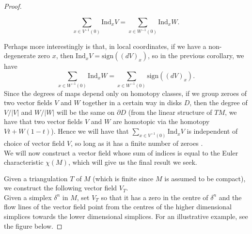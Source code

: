 \begin{proof}
\begin{corollary}
\[
\sum_{x\in V^{-1}(0)}\mathrm{Ind}_xV=\sum_{x\in W^{-1}(0)}\mathrm{Ind}_xW.
\]
\end{corollary}
Perhaps more interestingly is that, in local coordinates, if we have a non-degenerate zero $x$, then $\mathrm{Ind}_xV=\mathrm{sign}((dV)_x)$, so in the previous corollary, we have
\[
\sum_{x\in W^{-1}(0)}\mathrm{Ind}_xW=\sum_{x\in W^{-1}(0)}\mathrm{sign}((dV)_x).
\]
Since the degrees of maps depend only on homotopy classes, if we group zeroes of two vector fields $V$ and $W$ together in a certain way in disks $D$, then the degree of $V/|V|$ and $W/|W|$ will be the same on $\partial D$ (from the linear structure of $TM$, we have that two vector fields $V$ and $W$ are homotopic via the homotopy $Vt+W(1-t)$). Hence we will have that $\sum_{x\in V^{-1}(0)}\mathrm{Ind}_xV$ is independent of choice of vector field $V$, so long as it has a finite number of zeroes \cite{wrightPoincare, BurnsGidea}.\\

We will now construct a vector field whose sum of indices is equal to the Euler characteristic $\chi(M)$, which will give us the final result we seek.

Given a triangulation $T$ of $M$ (which is finite since $M$ is assumed to be compact), we construct the following vector field $V_T$. \\

Given a simplex $\delta^n$ in $M$, set $V_T$ so that it has a zero in the centre of $\delta^n$ and the flow lines of the vector field point from the centres of the higher dimensional simplices towards the lower dimensional simplices. For an illustrative example, see the figure below. 


\end{proof}
